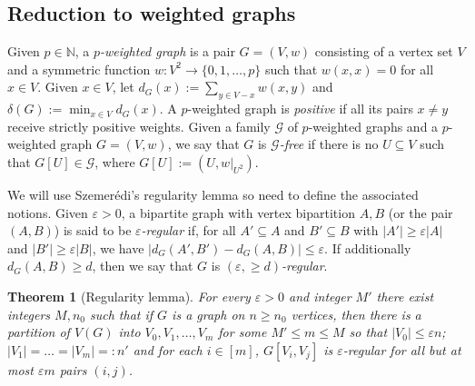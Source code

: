 \documentclass[10pt,a4paper]{article}
\newtheorem{theorem}{Theorem}[section]
\theoremstyle{definition}
\def\eps{{\varepsilon}}
\begin{document}




\subsection{Reduction to weighted graphs}\label{sec-reduction-weighted-graph}



Given $p\in\mathbb{N}$, a \emph{$p$-weighted graph} is a pair $G=(V,w)$ consisting of a vertex set $V$
and a symmetric function $w : V^2 \rightarrow \lbrace 0,1,\ldots, p\rbrace$ such that
$w(x,x)=0$ for all $x \in V$.
Given $x \in V$, let $d_G(x) := \sum_{y \in V-x}w(x,y)$ and $\delta(G) := \min_{x \in V}d_G(x)$. A $p$-weighted graph is \emph{positive} if all its pairs $x \neq y$ receive strictly positive weights.
Given a family $\mathcal{G}$ of $p$-weighted graphs and a $p$-weighted graph $G=(V,w)$, we say that $G$ is \emph{$\mathcal{G}$-free} if there is no $U \subseteq V$ such that $G[U] \in \mathcal{G}$, where
$G[U] := (U,w|_{U^2})$.

We will use Szemer\'edi's regularity lemma so need to define the associated notions.
Given $\eps>0$, a bipartite graph with vertex bipartition $A,B$ (or the pair $(A,B)$) is said to be \emph{$\eps$-regular} if, for all $A' \subseteq A$ and $B' \subseteq B$ with $|A'| \geq \eps|A|$ and $|B'| \geq \eps|B|$, we have $|d_G(A',B')-d_G(A,B)| \leq \eps$.
If additionally $d_G(A,B) \geq d$, then we say that $G$ is \emph{$(\eps,\geq\!d)$-regular}.



\begin{theorem}[Regularity lemma]\label{reg}
	For every $\eps>0$ and integer $M'$ there exist integers $M,n_0$ such that if $G$ is a graph on $n \geq n_0$ vertices, then there is a partition of $V(G)$ into $V_0,V_1,\ldots,V_m$ for some $M' \leq m \leq M$ so that $|V_0| \leq \eps n$; $|V_1|=\ldots=|V_m|=:n'$ and for each $i\in[m]$, $G[V_i,V_j]$ is $\eps$-regular for all but at most $\eps m$ pairs $(i,j)$.
\end{theorem}
\end{document}

